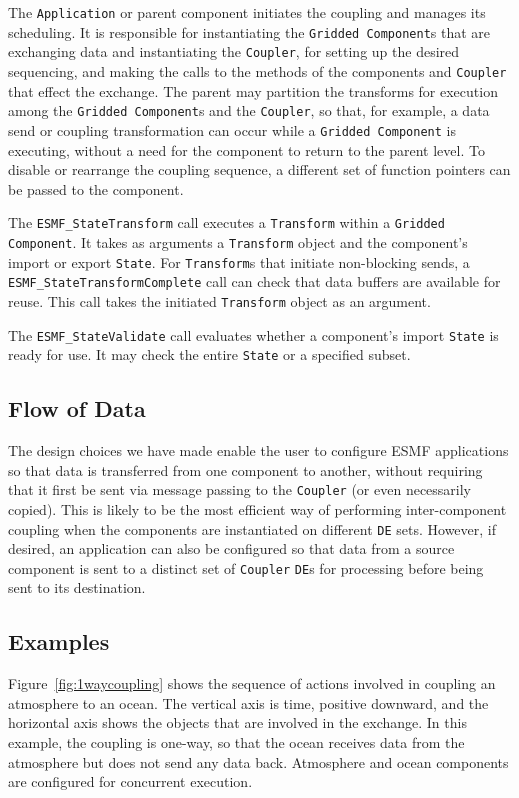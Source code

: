 The {\tt Application} or parent component initiates the coupling and manages 
its scheduling.  It is responsible for instantiating the {\tt Gridded Component}s
that are exchanging data and instantiating the {\tt Coupler}, for setting up the desired 
sequencing, and making the calls to the methods of the components and 
{\tt Coupler} that effect the exchange.  The parent may partition the 
transforms
for execution among the {\tt Gridded Component}s and the {\tt Coupler}, so that, for 
example, a data send or coupling transformation can occur while a {\tt Gridded 
Component} is executing, without a need for the component to return to the
parent level.  
To disable or rearrange the coupling sequence, a different set of function
pointers can be passed to the component.

The {\tt ESMF\_StateTransform} call executes a {\tt Transform} 
within a {\tt Gridded Component}.  It takes as arguments a
{\tt Transform} object and the component's import or export {\tt State}.  
For {\tt Transform}s that initiate non-blocking sends, a {\tt ESMF\_StateTransformComplete} 
call can check that data  buffers are available for reuse.  This 
call takes the initiated {\tt Transform} object as an argument.

The {\tt ESMF\_StateValidate} call evaluates whether a component's 
import {\tt State} is ready for use.  It may check the entire {\tt State} or 
a specified subset.

\subsection{Flow of Data}
\label{sec:dataflow}
The design choices we have made enable the user to configure ESMF
applications so that data is transferred from one component to another, 
without requiring that it first be sent via message passing to the
{\tt Coupler} (or even necessarily
copied).  This is likely to be the most efficient way of performing 
inter-component coupling when the components are instantiated on different
{\tt DE} sets.  However, if desired, an application can also be configured so that
data from a source component is sent to a distinct set of {\tt Coupler} 
{\tt DE}s for processing before being sent to its destination.

\subsection{Examples}

Figure~\ref{fig:1waycoupling} shows the sequence of actions involved
in coupling an atmosphere to an ocean.  The vertical axis is time, positive
downward, and the horizontal axis shows the objects that are involved in the
exchange.  In this example, the coupling is one-way, so that the ocean 
receives data from the atmosphere but does not send any data back.  Atmosphere
and ocean components are configured for concurrent execution.

